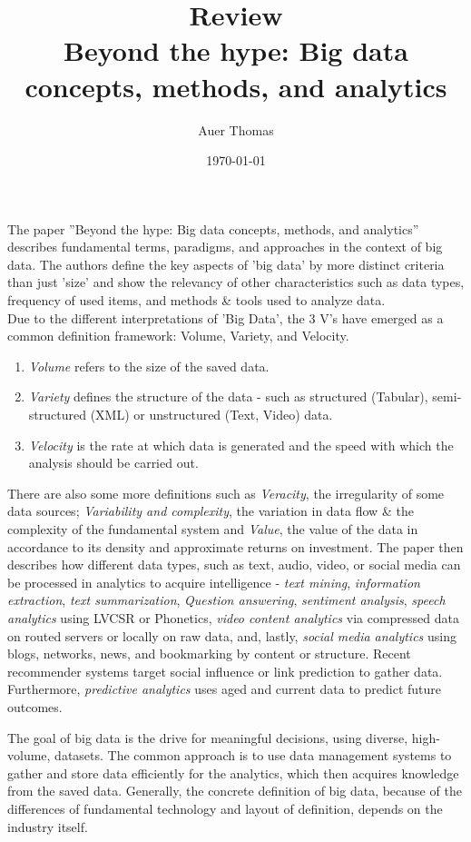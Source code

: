 \documentclass{article}
\title{\textbf{Review}\\Beyond the hype: Big data concepts, methods, and analytics}
\author{Auer Thomas}
\date{\today}
\begin{document}
\maketitle
\horrule{1pt}


\vspace{2em}
 
The paper ''Beyond the hype: Big data concepts, methods, and analytics'' describes fundamental terms, paradigms, and approaches in the context of big data. 
The authors define the key aspects of 'big data' by more distinct criteria than just 'size' and show the relevancy of other characteristics such as data types, frequency of used items, and methods \& tools used to analyze data.\\
Due to the different interpretations of 'Big Data', the 3 V's have emerged as a common definition framework: Volume, Variety, and Velocity.
\begin{enumerate}[$\circ$]
    \item \emph{Volume} refers to the size of the saved data. 
    \item \emph{Variety} defines the structure of the data - such as structured (Tabular), semi-structured (XML) or unstructured (Text, Video) data.
    \item \emph{Velocity} is the rate at which data is generated and the speed with which the analysis should be carried out.
\end{enumerate}
There are also some more definitions such as \emph{Veracity}, the irregularity of some data sources; \emph{Variability and complexity}, 
the variation in data flow \& the complexity of the fundamental system and \emph{Value}, the value of the data in accordance to its density and approximate returns on investment. 
The paper then describes how different data types, such as text, audio, video, or social media can be processed in analytics to acquire intelligence - 
\emph{text mining}, \emph{information extraction}, \emph{text summarization}, \emph{Question answering}, \emph{sentiment analysis}, \emph{speech analytics}
using LVCSR or Phonetics, \emph{video content analytics} via compressed data on routed servers or locally on raw data, and, lastly, \emph{social media analytics} using 
blogs, networks, news, and bookmarking by content or structure. Recent recommender systems target social influence or link prediction to gather data.
Furthermore, \emph{predictive analytics} uses aged and current data to predict future outcomes.

The goal of big data is the drive for meaningful decisions, using diverse, high-volume, datasets. 
The common approach is to use data management systems to gather and store data efficiently for the analytics, which then acquires knowledge from the saved data.
Generally, the concrete definition of big data, because of the differences of fundamental technology and layout of definition, depends on the industry itself.
\end{document}
